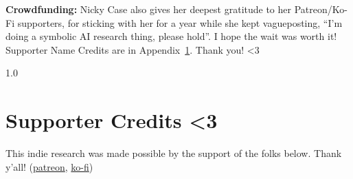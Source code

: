 \documentclass[11pt]{article}
\begin{document}
\textbf{Crowdfunding:} Nicky Case also gives her deepest gratitude to her Patreon/Ko-Fi supporters, for sticking with her for a year while she kept vagueposting, ``I'm doing a symbolic AI research thing, please hold''. I hope the wait was worth it! Supporter Name Credits are in Appendix~\ref{app:supporters}. Thank you! <3





\clearpage
\raggedbottom 
\onecolumn
\renewcommand{\bibfont}{\small\raggedright}
\setlength{\bibsep}{0.4em}        %
\begin{spacing}{1.0}

\end{spacing}


\appendix
\section{Supporter Credits <3}
\label{app:supporters}

\noindent This indie research was made possible by the support of the folks below. Thank y'all! (\href{https://patreon.com/ncase}{patreon}, \href{https://ko-fi.com/nickycase}{ko-fi})

\vspace{1.5em}
\end{document}
